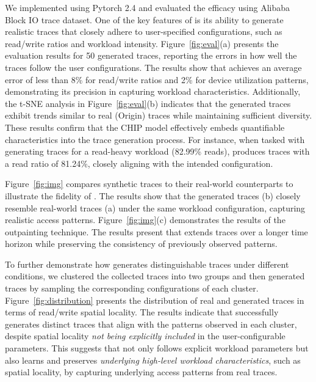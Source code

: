 \documentclass[
  manuscript=article,  %
  layout=preprint,  %
  year=20xx,
  volume=x,
]{extra/joas}
\begin{document}
We implemented \Design using Pytorch 2.4 and evaluated the efficacy using Alibaba Block IO trace dataset.
One of the key features of \Design is its ability to generate realistic traces that closely adhere to user-specified configurations, such as read/write ratios and workload intensity. Figure~\ref{fig:eval}(a) presents the evaluation results for 50 generated traces, reporting the errors in how well the traces follow the user configurations. The results show that \Design achieves an average error of less than 8\% for read/write ratios and 2\% for device utilization patterns, demonstrating its precision in capturing workload characteristics. Additionally, the t-SNE analysis in Figure~\ref{fig:eval}(b) indicates that the generated traces exhibit trends similar to real (\textsf{Origin}) traces while maintaining sufficient diversity. These results confirm that the CHIP model effectively embeds quantifiable characteristics into the trace generation process. For instance, when tasked with generating traces for a read-heavy workload (82.99\% reads), \Design produces traces with a read ratio of 81.24\%, closely aligning with the intended configuration.  

Figure~\ref{fig:img} compares synthetic traces to their real-world counterparts to illustrate the fidelity of \Design. The results show that the generated traces (b) closely resemble real-world traces (a) under the same workload configuration, capturing realistic access patterns. Figure~\ref{fig:img}(c) demonstrates the results of the outpainting technique. The results present that \Design extends traces over a longer time horizon while preserving the consistency of previously observed patterns.

To further demonstrate how \Design generates distinguishable traces under different conditions, we clustered the collected traces into two groups and then generated traces by sampling the corresponding configurations of each cluster. Figure~\ref{fig:distribution} presents the distribution of real and generated traces in terms of read/write spatial locality. The results indicate that \Design successfully generates distinct traces that align with the patterns observed in each cluster, despite spatial locality \textit{not being explicitly included} in the user-configurable parameters. This suggests that \Design not only follows explicit workload parameters but also learns and preserves \textit{underlying high-level workload characteristics}, such as spatial locality, by capturing underlying access patterns from real traces.  
\end{document}
